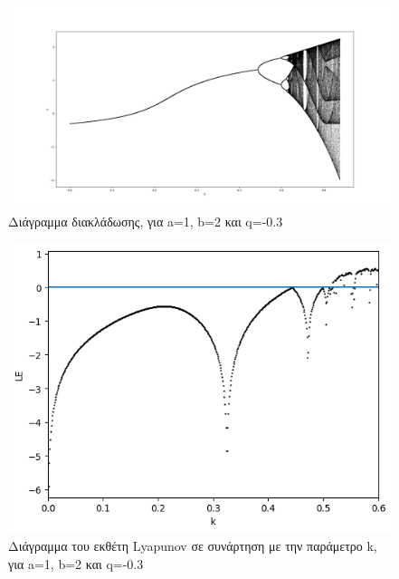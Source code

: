 \begin{figure}[h!]
	\centering
	\includegraphics[width=0.6\linewidth]{LateX images/graphs q03/g1}
	\caption{ Διάγραμμα διακλάδωσης, για a=1, b=2 και q=-0.3}
	\label{f:g8}
\end{figure}

\begin{figure}[h!]
	\centering
	\includegraphics[width=0.6\linewidth]{LateX images/graphs q03/g2}
	\caption{ Διάγραμμα του εκθέτη Lyapunov σε συνάρτηση με την παράμετρο k, για a=1, b=2 και q=-0.3}
	\label{f:g9}
\end{figure}

